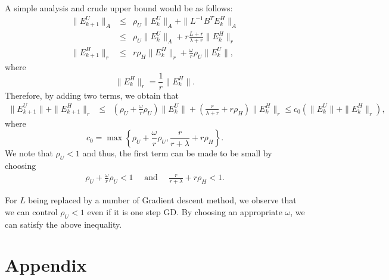 A simple analysis and crude upper bound would be as follows: 
\begin{eqnarray*}
\|E_{k+1}^U\|_{A} &\leq& \rho_U \|E_k^U\|_{A} + \|L^{-1} B^T E_k^H\|_{A} \\ 
&\leq&  \rho_U \|E_k^U\|_{A} + r \frac{L + r}{\lambda + r} \|E_k^H\|_r \\
\|E_{k+1}^H\|_r &\leq& r \rho_H \|E_k^H\|_r + \frac{\omega}{r} \rho_U \|E_k^U\|,  
\end{eqnarray*}
where 
\begin{equation}
\|E_k^H\|_r = \frac{1}{r}\|E_k^H\|.   
\end{equation}
Therefore, by adding two terms, we obtain that 
\begin{eqnarray*}
\|E_{k+1}^U\| + \|E_{k+1}^H\|_r &\leq& \left ( \rho_U + \frac{\omega}{r} \rho_U \right) \|E_k^U\| + \left ( \frac{r}{\lambda + r} + r \rho_H \right ) \|E_k^H\|_r \leq c_0 \left ( \|E_{k}^U\| + \|E_{k}^H\|_r \right ),  
\end{eqnarray*}
where 
\begin{equation}
c_0 = \max \left \{ \rho_U + \frac{\omega}{r} \rho_U, \frac{r}{r+\lambda} + r\rho_H \right \}. 
\end{equation} 
We note that $\rho_U < 1$ and thus, the first term can be made to be small by choosing 
\begin{eqnarray}
\rho_U + \frac{\omega}{r} \rho_U < 1 \quad \mbox{ and } \quad \frac{r}{r+\lambda} + r\rho_H < 1. 
\end{eqnarray}
\begin{remark}
For $L$ being replaced by a number of Gradient descent method, we observe that we can control $\rho_U < 1$ even if it is one step GD. By choosing an appropriate $\omega$, we can satisfy the above inequality. 
\end{remark}

% 

\section{Appendix} 

